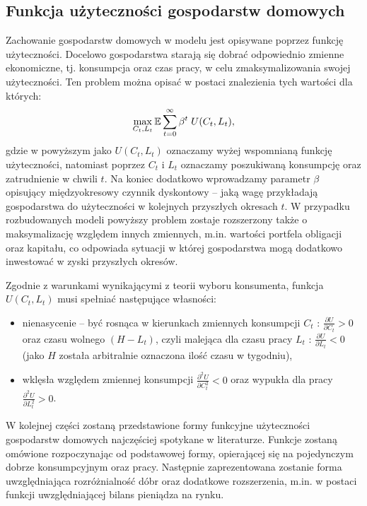 \subsection{Funkcja użyteczności gospodarstw domowych}

Zachowanie gospodarstw domowych w modelu jest opisywane poprzez funkcję użyteczności. Docelowo gospodarstwa starają się dobrać odpowiednio zmienne ekonomiczne, tj. konsumpcja oraz czas pracy, w celu zmaksymalizowania swojej użyteczności. Ten problem można opisać w postaci znalezienia tych wartości dla których:
\begin{equation}
    \max_{C_t,L_t}\mathbb{E} \sum_{t=0}^{\infty} \beta^t\;U(C_t,L_t),
\end{equation}
gdzie w powyższym jako $U(C_t,L_t)$ oznaczamy wyżej wspomnianą funkcję użyteczności, natomiast poprzez $C_t$ i $L_t$ oznaczamy poszukiwaną konsumpcję oraz zatrudnienie w chwili $t$. Na koniec dodatkowo wprowadzamy parametr $\beta$ opisujący międzyokresowy czynnik dyskontowy -- jaką wagę przykładają gospodarstwa do użyteczności w kolejnych przyszłych okresach $t$. W przypadku rozbudowanych modeli powyższy problem zostaje rozszerzony także o maksymalizację względem innych zmiennych, m.in. wartości portfela obligacji oraz kapitału, co odpowiada sytuacji w której gospodarstwa mogą dodatkowo inwestować w zyski przyszłych okresów.

Zgodnie z warunkami wynikającymi z teorii wyboru konsumenta, funkcja $U(C_t, L_t)$ musi spełniać następujące własności:
\begin{itemize}
    \item nienasycenie -- być rosnąca w kierunkach zmiennych konsumpcji $C_t$ : $\frac{\partial U}{\partial C_t} > 0$ oraz czasu wolnego $(H - L_t)$, czyli malejąca dla czasu pracy $L_t$ :  $\frac{\partial U}{\partial L_t} < 0$(jako $H$ została arbitralnie oznaczona ilość czasu w tygodniu),
    \item wklęsła względem zmiennej konsumpcji $\frac{\partial ^2 U}{\partial C_t^2} < 0$ oraz wypukła dla pracy $\frac{\partial ^2 U}{\partial L_t^2} > 0$.
\end{itemize}

W kolejnej części zostaną przedstawione formy funkcyjne użyteczności gospodarstw domowych najczęściej spotykane w literaturze. Funkcje zostaną omówione rozpoczynając od podstawowej formy, opierającej się na pojedynczym dobrze konsumpcyjnym oraz pracy. Następnie zaprezentowana zostanie forma uwzględniająca rozróżnialność dóbr oraz dodatkowe rozszerzenia, m.in. w postaci funkcji uwzględniającej bilans pieniądza na rynku.

